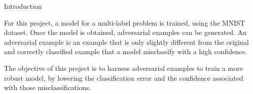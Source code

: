 \begin{frame}{Introduction}

For this project, a model for a multi-label problem is trained, using the MNIST dataset. Once the model is obtained, adversarial examples can be generated. An adversarial example is an example that is only slightly different from the original and correctly classified example that a model misclassify with a high confidence.

\vspace{0.1in}

The objective of this project is to harness adversarial examples to train a more robust model, by lowering the classification error and the confidence associated with those misclassifications.

\end{frame}

